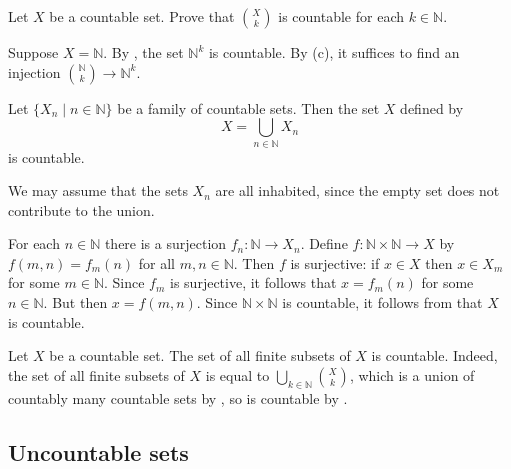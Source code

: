 \begin{exercise} \label{exFiniteSubsetsCountableFixedSize}
Let $X$ be a countable set. Prove that $\binom{X}{k}$ is countable for each $k \in \mathbb{N}$.
\begin{backhint}
Suppose $X=\mathbb{N}$. By , the set $\mathbb{N}^k$ is countable. By (c), it suffices to find an injection $\binom{\mathbb{N}}{k} \to \mathbb{N}^k$.
\end{backhint}
\end{exercise}

\begin{theorem}
\label{thmCountableUnionOfCountableSetIsCountable}
Let $\{ X_n \mid n \in \mathbb{N} \}$ be a family of countable sets. Then the set $X$ defined by
\[ X = \bigcup_{n \in \mathbb{N}} X_n \]
is countable.
\end{theorem}

\begin{cproof}
We may assume that the sets $X_n$ are all inhabited, since the empty set does not contribute to the union.

For each $n \in \mathbb{N}$ there is a surjection $f_n : \mathbb{N} \to X_n$. Define $f : \mathbb{N} \times \mathbb{N} \to X$ by $f(m,n)=f_m(n)$ for all $m,n \in \mathbb{N}$. Then $f$ is surjective: if $x \in X$ then $x \in X_m$ for some $m \in \mathbb{N}$. Since $f_m$ is surjective, it follows that $x=f_m(n)$ for some $n \in \mathbb{N}$. But then $x=f(m,n)$. Since $\mathbb{N} \times \mathbb{N}$ is countable, it follows from  that $X$ is countable.
\end{cproof}

\begin{example}
\label{exCountableSubsetsOfCountableSetIsCountable}
Let $X$ be a countable set. The set of all finite subsets of $X$ is countable. Indeed, the set of all finite subsets of $X$ is equal to $\displaystyle \bigcup_{k \in \mathbb{N}} \binom{X}{k}$, which is a union of countably many countable sets by , so is countable by .
\end{example}

\subsection*{Uncountable sets}

